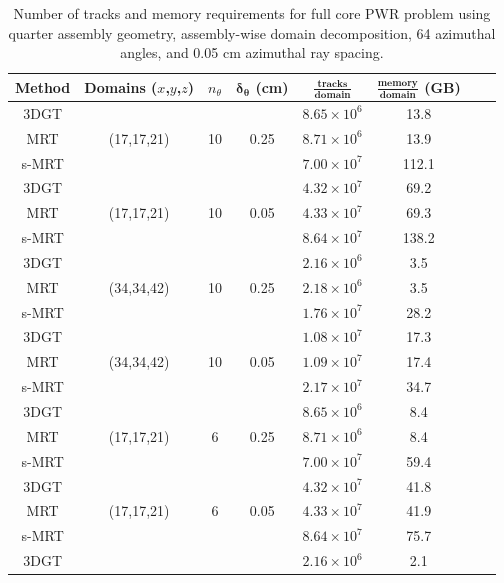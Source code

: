 \begin{table}[h]
	\centering
	\caption{Number of tracks and memory requirements for full core PWR problem using quarter assembly geometry, assembly-wise domain decomposition, 64 azimuthal angles, and 0.05 cm azimuthal ray spacing.}
	\begin{tabular}{cccccccc}
		\toprule
		\textbf{Method} & \textbf{Domains ($x$,$y$,$z$)} & \textbf{$n_\theta$} & \textbf{$\boldsymbol{\delta_\theta}$ (cm)} & $\frac{\textbf{tracks}}{\textbf{domain}}$ & $\frac{\textbf{memory}}{\textbf{domain}}$ \textbf{(GB)} \\
		\midrule
		3DGT  &            &    &      & $8.65 \times 10^{6}$ & 13.8 \\
		MRT   & (17,17,21) & 10 & 0.25 & $8.71 \times 10^{6}$ & 13.9 \\
		s-MRT &            &    &      & $7.00 \times 10^{7}$ & 112.1 \\ \hline
		3DGT  &            &    &      & $4.32 \times 10^{7}$ & 69.2 \\
		MRT   & (17,17,21) & 10 & 0.05 & $4.33 \times 10^{7}$ & 69.3 \\
		s-MRT &            &    &      & $8.64 \times 10^{7}$ & 138.2 \\ \hline
		3DGT  &            &    &      & $2.16 \times 10^{6}$ & 3.5 \\
		MRT   & (34,34,42) & 10 & 0.25 & $2.18 \times 10^{6}$ & 3.5 \\
		s-MRT &            &    &      & $1.76 \times 10^{7}$ & 28.2 \\ \hline
		3DGT  &            &    &      & $1.08 \times 10^{7}$ & 17.3 \\
		MRT   & (34,34,42) & 10 & 0.05 & $1.09 \times 10^{7}$ & 17.4 \\ 
		s-MRT &            &    &      & $2.17 \times 10^{7}$ & 34.7 \\ \hline
		3DGT  &            &    &      & $8.65 \times 10^{6}$ & 8.4 \\
		MRT   & (17,17,21) & 6  & 0.25 & $8.71 \times 10^{6}$ & 8.4 \\
		s-MRT &            &    &      & $7.00 \times 10^{7}$ & 59.4 \\ \hline
		3DGT  &            &    &      & $4.32 \times 10^{7}$ & 41.8 \\
		MRT   & (17,17,21) & 6  & 0.05 & $4.33 \times 10^{7}$ & 41.9 \\
		s-MRT &            &    &      & $8.64 \times 10^{7}$ & 75.7 \\ \hline
		3DGT  &            &    &      & $2.16 \times 10^{6}$ & 2.1 \\

\end{tabular}
\end{table}
